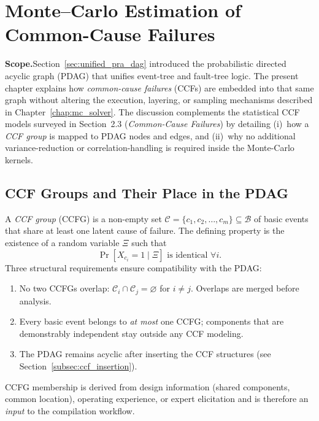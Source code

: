 \chapter{Monte--Carlo Estimation of Common-Cause Failures}
\label{chap:ccf_in_pdag}

\noindent\textbf{Scope.}\;Section~\ref{sec:unified_pra_dag} introduced the
probabilistic directed acyclic graph (PDAG) that unifies event-tree and
fault-tree logic.  The present chapter explains how \emph{common-cause
failures} (CCFs) are embedded into that same graph without altering the
execution, layering, or sampling mechanisms described in
Chapter~\ref{chap:mc_solver}.  The discussion complements the statistical CCF
models surveyed in Section~2.3 (\emph{Common-Cause Failures}) by detailing
(i)~how a \textit{CCF group} is mapped to PDAG nodes and edges, and
(ii)~why no additional variance-reduction or correlation-handling is required
inside the Monte-Carlo kernels.

\section{CCF Groups and Their Place in the PDAG}
\label{sec:ccf_group_def}

A \emph{CCF group} (CCFG) is a non-empty set
\(\mathcal{C}=\{c_1,c_2,\dots ,c_m\}\subseteq \mathcal{B}\) of basic events
that share at least one latent cause of failure.  The defining property is the
existence of a random variable
\(\Xi\) such that
\[\Pr[ X_{c_i}=1 \mid \Xi ] \text{ is identical } \forall i.\]
Three structural requirements ensure compatibility with the PDAG:
\begin{enumerate}
  \item No two CCFGs overlap: \(\mathcal{C}_i\cap\mathcal{C}_j=\varnothing\) for
        \(i\ne j\).  Overlaps are merged before analysis.
  \item Every basic event belongs to \emph{at most} one CCFG; components that
        are demonstrably independent stay outside any CCF modeling.
  \item The PDAG remains acyclic after inserting the CCF structures (see
        Section~\ref{subsec:ccf_insertion}).
\end{enumerate}
CCFG membership is derived from design information (shared components, common
location), operating experience, or expert elicitation and is therefore an
\emph{input} to the compilation workflow.

